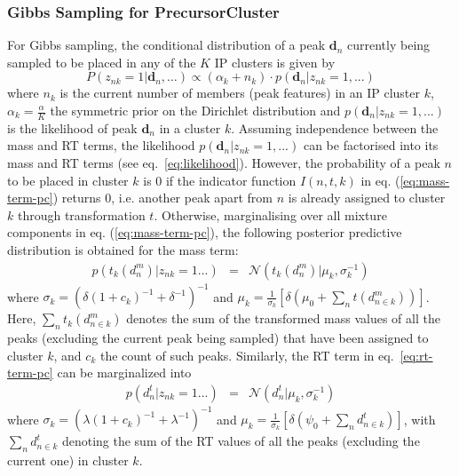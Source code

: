\subsubsection{Gibbs Sampling for PrecursorCluster\label{sub:ip-clustering-gibbs}}

For Gibbs sampling, the conditional distribution of a peak $\boldsymbol{d}_{n}$ currently being sampled to be placed in any of the $K$ IP clusters is given by
\begin{equation}
P(z_{nk}=1|\boldsymbol{d}_{n},\ldots)\propto(\alpha_{k}+n_{k})\cdot p(\mathbf{d}_{n}|z_{nk}=1,...)\label{eq:finite_conditional}
\end{equation}
where $n_{k}$ is the current number of members (peak features) in an IP cluster $k$, $\alpha_{k}=\frac{\alpha}{K}$ the symmetric prior on the Dirichlet distribution and $p(\mathbf{d}_{n}|z_{nk}=1,...)$ is the likelihood of peak $\mathbf{d}_{n}$ in a cluster $k$. Assuming independence between the mass and RT terms, the likelihood $p(\mathbf{d}_{n}|z_{nk}=1,...)$ can be factorised into its mass and RT terms (see eq.~\ref{eq:likelihood}). However, the probability of a peak $n$ to be placed in cluster $k$ is 0 if the indicator function $I(n,t, k)$ in eq. (\ref{eq:mass-term-pc}) returns 0, i.e. another peak apart from $n$ is already assigned to cluster $k$ through transformation $t$. Otherwise, marginalising over all mixture components in eq. (\ref{eq:mass-term-pc}), the following posterior predictive distribution is obtained for the mass term: 
\begin{eqnarray}
p(t_{k}(d_{n}^{m})|z_{nk}=1...) & = & \mathcal{N}(t_{k}(d_{n}^{m})|\mu_{k},\sigma_{k}^{-1})\label{eq:mass-term}
\end{eqnarray}
where $\sigma_{k}=(\delta(1+c_{k})^{-1}+\delta^{-1})^{-1}$ and $\mu_{k}=\frac{1}{\sigma_{k}}\left[\delta(\mu_{0}+\sum_{n}t(d_{n\in k}^{m}))\right]$.
Here, $\sum_{n}t_{k}(d_{n\in k}^{m})$ denotes the sum of the transformed mass values of all the peaks (excluding the current peak being sampled) that have been assigned to cluster $k$, and $c_{k}$ the count of such peaks. Similarly, the RT term in eq.~\ref{eq:rt-term-pc} can be marginalized into
\begin{eqnarray}
p(d_{n}^{t}|z_{nk}=1...) & = & \mathcal{N}(d_{n}^{t}|\mu_{k},\sigma_{k}^{-1})\label{eq:rt-term}
\end{eqnarray}
where $\sigma_{k}=(\lambda(1+c_{k})^{-1}+\lambda^{-1})^{-1}$ and $\mu_{k}=\frac{1}{\sigma_{k}}\left[\delta(\psi_{0}+\sum_{n}d_{n\in k}^{t})\right]$, with $\sum_{n}d_{n\in k}^{t}$ denoting the sum of the RT values of all the peaks (excluding the current one) in cluster $k$.

